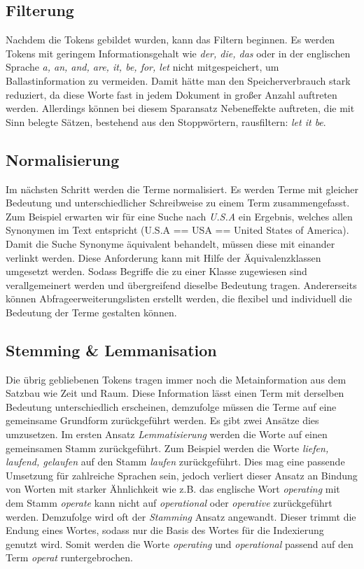 \subsection[Filterung]{Filterung}

Nachdem die Tokens gebildet wurden, kann das Filtern beginnen. Es werden
Tokens mit geringem Informationsgehalt wie \textit{der, die, das} oder in der
englischen Sprache \textit{a, an, and, are, it, be, for, let} nicht
mitgespeichert, um Ballastinformation zu vermeiden. Damit hätte man den
Speicherverbrauch stark reduziert, da diese Worte fast in jedem
Dokument in großer Anzahl auftreten werden. Allerdings können bei
diesem Sparansatz Nebeneffekte auftreten, die mit Sinn belegte Sätzen,
bestehend aus den Stoppwörtern, rausfiltern: \textit{let it be}. 

\subsection[Normalisierung ]{Normalisierung }
Im nächsten Schritt werden die Terme normalisiert. Es werden Terme mit
gleicher Bedeutung und unterschiedlicher Schreibweise zu einem Term
zusammengefasst. Zum Beispiel erwarten wir für eine Suche nach \textit{U.S.A}
ein Ergebnis, welches allen Synonymen im Text entspricht (U.S.A == USA
== United States of America). 
\newline
Damit die Suche Synonyme äquivalent behandelt, müssen diese mit einander
verlinkt werden. Diese Anforderung kann mit Hilfe der Äquivalenzklassen
umgesetzt werden. Sodass Begriffe die zu einer Klasse zugewiesen sind 
verallgemeinert werden und übergreifend dieselbe Bedeutung tragen.
Andererseits können Abfrageerweiterungslisten erstellt werden, die
flexibel und individuell die Bedeutung der Terme gestalten können.


\subsection[Stemming \& Lemmanisation]{Stemming \& Lemmanisation}
Die übrig gebliebenen Tokens tragen immer noch die Metainformation aus
dem Satzbau wie Zeit und Raum. Diese Information lässt einen Term mit
derselben Bedeutung unterschiedlich erscheinen, demzufolge müssen die
Terme auf eine gemeinsame Grundform zurückgeführt werden. 
\bigbreak
Es gibt zwei Ansätze dies umzusetzen. Im ersten Ansatz \textit{Lemmatisierung}
werden die Worte auf einen gemeinsamen Stamm zurückgeführt. Zum
Beispiel werden die Worte \textit{liefen, laufend, gelaufen} auf den Stamm
\textit{laufen} zurückgeführt. Dies mag eine passende Umsetzung für zahlreiche
Sprachen sein, jedoch verliert dieser Ansatz an Bindung von Worten mit
starker Ähnlichkeit wie z.B. das englische Wort \textit{operating} mit dem
Stamm \textit{operate} kann nicht auf \textit{operational} oder \textit{operative}
zurückgeführt werden. Demzufolge wird oft der \textit{Stamming} Ansatz
angewandt. Dieser trimmt die Endung eines Wortes, sodass nur die Basis
des Wortes für die Indexierung genutzt wird. Somit werden die Worte
\textit{operating} und \textit{operational} passend auf den Term \textit{operat}
runtergebrochen.

